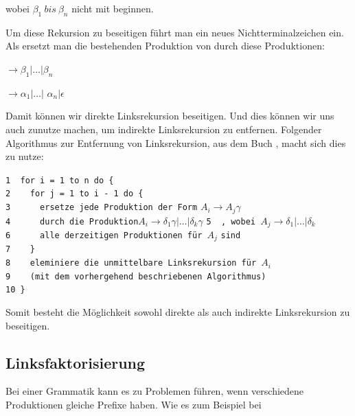 \noindent wobei $\beta_1\ bis\ \beta_n$ nicht mit 
beginnen.\vspace{10pt}

\noindent Um diese Rekursion zu beseitigen führt man ein neues
Nichtterminalzeichen  ein. Als ersetzt man die
bestehenden Produktion von
 durch diese Produktionen:\vspace{10pt}

 $\to \beta_1 | \ldots | \beta_n$

 $\to \alpha_1$$|\ldots|$
$\alpha_n$$|\epsilon$\vspace{10pt}

\noindent Damit können wir direkte Linksrekursion beseitigen. Und dies können wir
uns auch zunutze machen, um indirekte Linksrekursion zu entfernen. Folgender
Algorithmus zur Entfernung von Linksrekursion, aus dem Buch \cite{Compilers},
macht sich dies zu nutze:\vspace{10pt}

\noindent
\verb|1  for i = 1 to n do {|\\
\verb|2    for j = 1 to i - 1 do {|\\
\verb|3      ersetze jede Produktion der Form| $A_i \to A_j \gamma$ \verb| |\\ 
\verb|4      durch die Produktion|$A_i \to \delta_1\gamma|\ldots|\delta_k\gamma$
\verb|5  , wobei |$A_j \to \delta_1|\ldots|\delta_k$\\ 
\verb|6      alle derzeitigen Produktionen für |$A_j$ \verb|sind|\\ 
\verb|7    }|\\
\verb|8    eleminiere die unmittelbare Linksrekursion für |$A_i$\\
\verb|9    (mit dem vorhergehend beschriebenen Algorithmus)|\\
\verb|10 }|
\vspace{10pt}

Somit besteht die Möglichkeit sowohl direkte als auch indirekte Linksrekursion
zu beseitigen.\vspace{10pt}

\subsection{Linksfaktorisierung}

Bei einer Grammatik kann es zu Problemen führen, wenn verschiedene Produktionen
gleiche Prefixe haben. Wie es zum Beispiel bei \vspace{10pt}


